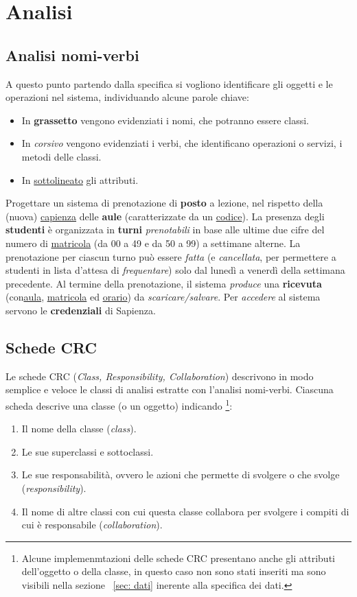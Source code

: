 \chapter{Analisi}

\section{Analisi nomi-verbi}
A questo punto partendo dalla specifica si vogliono identificare gli oggetti e le operazioni nel sistema, individuando alcune parole chiave: 

\begin{itemize}
\item In \textbf{grassetto} vengono evidenziati i nomi, che potranno essere classi.
\item In \textit{corsivo} vengono evidenziati i verbi, che identificano operazioni o servizi, i metodi delle classi.
\item In \underline{sottolineato} gli attributi. 
\end{itemize}


Progettare un sistema di prenotazione  di \textbf{posto} a lezione, nel rispetto della (nuova) \underline{capienza} delle \textbf{aule} (caratterizzate da un \underline{codice}). La presenza degli \textbf{studenti} è organizzata in \textbf{turni} \textit{prenotabili} in base alle ultime due cifre del numero di \underline{matricola} (da 00 a 49 e da 50 a 99) a settimane alterne. La prenotazione per ciascun turno può essere \textit{fatta} (e \textit{cancellata}, per permettere a studenti in lista d’attesa di \textit{frequentare}) solo dal lunedì a venerdì della settimana precedente. Al termine della prenotazione, il sistema \textit{produce} una \textbf{ricevuta} (con\underline{aula}, \underline{matricola} ed \underline{orario}) da \textit{scaricare/salvare}. Per \textit{accedere} al sistema servono le \textbf{credenziali} di Sapienza.





\section{Schede CRC}
Le schede CRC (\textit{Class, Responsibility, Collaboration})  descrivono in modo semplice e veloce le classi di analisi estratte con l'analisi nomi-verbi.
Ciascuna scheda descrive una classe (o un oggetto) indicando \footnote{Alcune implemenmtazioni delle schede CRC presentano anche gli attributi dell’oggetto o della classe, in questo caso non sono stati inseriti ma sono visibili nella sezione ~\ref{sec: dati} inerente alla specifica dei dati.}:
\begin{enumerate}
\item Il nome della classe (\textit{class}).
\item Le sue superclassi e sottoclassi.
\item Le sue responsabilità, ovvero le azioni che permette di svolgere o che svolge (\textit{responsibility}).
\item Il nome di altre classi con cui questa classe collabora per svolgere i compiti di cui è responsabile (\textit{collaboration}).
\end{enumerate}
\medskip
  

